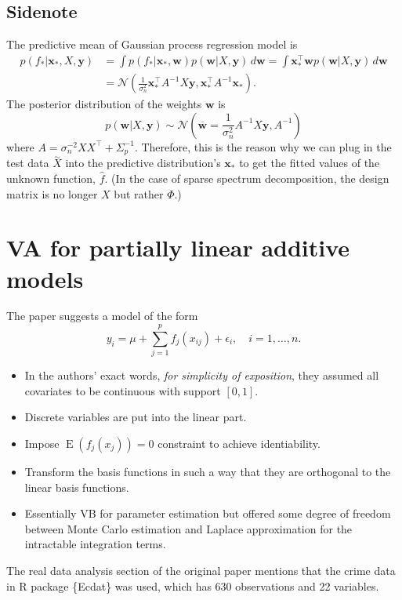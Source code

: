 \documentclass[11pt]{article}
\newcommand{\opn}{\operatorname}
\begin{document}
\subsection{Sidenote}
  The predictive mean of Gaussian process regression model is
  \begin{align}
    p\left(f_{*}|\mathbf{x}_{*}, X, \mathbf{y}\right) &= \int p\left(f_{*}|\mathbf{x}_{*}, \mathbf{w}\right)p\left(\mathbf{w}|X,\mathbf{y}\right)\,d\mathbf{w} = \int \mathbf{x}_{*}^{\top}\mathbf{w}p\left(\mathbf{w}|X,\mathbf{y}\right)\,d\mathbf{w}\\
    &=\mathcal{N}\left(\frac{1}{\sigma_{n}^{2}}\mathbf{x}_{*}^{\top}A^{-1}X\mathbf{y}, \mathbf{x}_{*}^{\top}A^{-1}\mathbf{x}_{*}\right).
  \end{align}
  The posterior distribution of the weights $\mathbf{w}$ is
  \begin{equation}
    p\left(\mathbf{w}|X,\mathbf{y}\right) \sim \mathcal{N}\left(\overline{\mathbf{w}}=\frac{1}{\sigma_{n}^{2}}A^{-1}X\mathbf{y}, A^{-1}\right)
  \end{equation}
  where $A = \sigma_{n}^{-2}XX^{\top}+\Sigma_{p}^{-1}$. Therefore, this is the reason why we can plug in the test data $\overset{\sim}{X}$ into the predictive distribution's $\mathbf{x}_{*}$ to get the fitted values of the unknown function, $\hat{f}$. (In the case of sparse spectrum decomposition, the design matrix is no longer $X$ but rather $\Phi$.)
\section{VA for partially linear additive models}
The paper suggests a model of the form
\begin{equation}
  y_{i} = \mu + \sum_{j=1}^{p}f_{j}\left(x_{ij}\right) + \epsilon_{i}, \quad i = 1, \ldots , n.
\end{equation}
\begin{itemize}
  \item In the authors' exact words, \textit{for simplicity of exposition}, they assumed all covariates to be continuous with support $\left[0, 1\right]$.
  \item Discrete variables are put into the linear part.
  \item Impose $\opn{E}\left(f_{j}\left(x_{j}\right)\right)=0$ constraint to achieve identiability.
  \item Transform the basis functions in such a way that they are orthogonal to the linear basis functions.
  \item Essentially VB for parameter estimation but offered some degree of freedom between Monte Carlo estimation and Laplace approximation for the intractable integration terms.
\end{itemize}
The real data analysis section of the original paper mentions that the crime data in \textsf{R} package \{\textsf{Ecdat}\} was used, which has 630 observations and 22 variables. 
\end{document}
